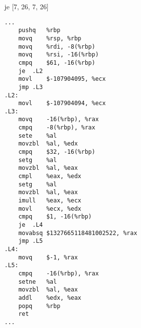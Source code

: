 \begin{figure}[H]
\begin{subfigure}[T]{0.30333333333333334\textwidth}
\begin{lrbox}{\mybox}
%
        \end{lrbox}\resizebox{\textwidth}{!}{\usebox{\mybox}}
\end{subfigure}
\begin{subfigure}[T]{0.30333333333333334\textwidth}
\caption*{}
\end{subfigure}
\begin{subfigure}[T]{0.30333333333333334\textwidth}
\caption*{}
\end{subfigure}
\hspace*{6mm}
\begin{subfigure}[T]{0.2733333333333333\textwidth}
\vspace*{2mm}\tiny je [7, 26, 7, 26]
\begin{lstlisting}[style=defstyle,language={[x86masm]Assembler},basicstyle=\tiny\ttfamily,breaklines=true]
...
	pushq	%rbp
	movq	%rsp, %rbp
	movq	%rdi, -8(%rbp)
	movq	%rsi, -16(%rbp)
	cmpq	$61, -16(%rbp)
	je	.L2
	movl	$-107904095, %ecx
	jmp	.L3
.L2:
	movl	$-107904094, %ecx
.L3:
	movq	-16(%rbp), %rax
	cmpq	-8(%rbp), %rax
	sete	%al
	movzbl	%al, %edx
	cmpq	$32, -16(%rbp)
	setg	%al
	movzbl	%al, %eax
	cmpl	%eax, %edx
	setg	%al
	movzbl	%al, %eax
	imull	%eax, %ecx
	movl	%ecx, %edx
	cmpq	$1, -16(%rbp)
	je	.L4
	movabsq	$1327665118481002522, %rax
	jmp	.L5
.L4:
	movq	$-1, %rax
.L5:
	cmpq	-16(%rbp), %rax
	setne	%al
	movzbl	%al, %eax
	addl	%edx, %eax
	popq	%rbp
	ret
...\end{lstlisting}
\end{subfigure}
\end{figure}
\newpage\noindent